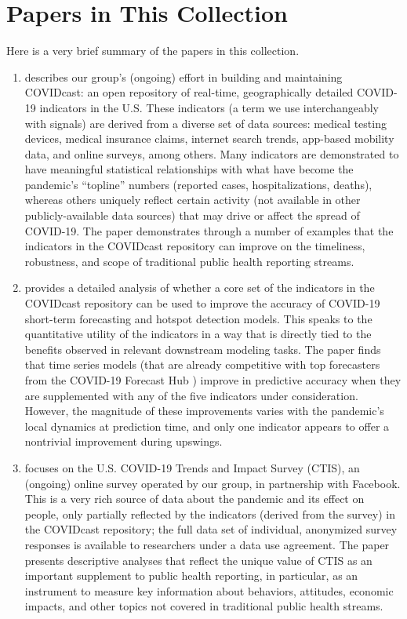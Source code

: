 \documentclass{article}
\begin{document}
\section{Papers in This Collection}

Here is a very brief summary of the papers in this collection.

\begin{enumerate}
\item \citet{Reinhart:2021} describes our group's (ongoing) effort in building
  and maintaining COVIDcast: an open repository of real-time, geographically
  detailed COVID-19 indicators in the U.S.  These indicators (a term we use
  interchangeably with signals) are derived from a diverse set of data sources:
  medical testing devices, medical insurance claims, internet search trends,
  app-based mobility data, and online surveys, among others.  Many indicators
  are demonstrated to have meaningful statistical relationships with what have
  become the pandemic's ``topline'' numbers (reported cases, hospitalizations,
  deaths), whereas others uniquely reflect certain activity (not available in
  other publicly-available data sources) that may drive or affect the spread of
  COVID-19.  The paper demonstrates through a number of examples that the
  indicators in the COVIDcast repository can improve on the timeliness,
  robustness, and scope of traditional public health reporting streams.   

\item \citet{McDonald:2021} provides a detailed analysis of whether a core set
  of the indicators in the COVIDcast repository can be used to improve the
  accuracy of COVID-19 short-term forecasting and hotspot detection models.
  This speaks to the quantitative utility of the indicators in a way that is
  directly tied to the benefits observed in relevant downstream modeling tasks.
  The paper finds that time series models (that are already competitive with top
  forecasters from the COVID-19 Forecast Hub \citep{ForecastHub}) improve in
  predictive accuracy when they are supplemented with any of the five indicators
  under consideration.  However, the magnitude of these improvements varies with
  the pandemic's local dynamics at prediction time, and only one indicator
  appears to offer a nontrivial improvement during upswings.  

\item \citet{Salomon:2021} focuses on the U.S. COVID-19 Trends and Impact Survey
  (CTIS), an (ongoing) online survey operated by our group, in partnership with
  Facebook.  This is a very rich source of data about the pandemic and its
  effect on people, only partially reflected by the indicators (derived from the
  survey) in the COVIDcast repository; the full data set of individual,
  anonymized survey responses is available to researchers under a data use
  agreement.  The paper presents descriptive analyses that reflect the unique
  value of CTIS as an important supplement to public health reporting, in
  particular, as an instrument to measure key information about behaviors,
  attitudes, economic impacts, and other topics not covered in traditional
  public health streams. 


\end{enumerate}
\end{document}
